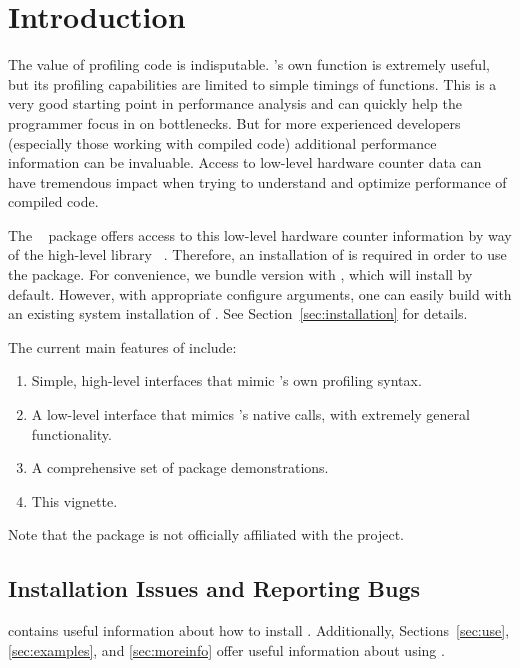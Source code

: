 \section{Introduction}
\label{sec:introduction}

The value of profiling code is indisputable.  \R's own  function 
is extremely useful, but its profiling capabilities are limited to simple 
timings of \R functions. This is a very good starting point in performance 
analysis and can quickly help the \R programmer focus in on bottlenecks.  But 
for more experienced developers (especially those working with compiled code) 
additional performance information can be invaluable. Access to low-level 
hardware counter data can have tremendous impact when trying to understand and 
optimize performance of compiled code. 

The \thispackage~\citep{Schmidt2014pbdPAPIpackage} package offers access to  
this low-level hardware counter information by way of the high-level \C library 
\PAPI~\citep{mucci1999papi}.  Therefore, an installation of \PAPI is required in 
order to use the package.  For convenience, we bundle \PAPI version \PAPIversion 
with \thispackage, which will install by default.  However, with appropriate 
configure arguments, one can easily build \thispackage with an existing system 
installation of \PAPI.  See Section~\ref{sec:installation} for details.

The current main features of \thispackage include:
\begin{enumerate}
  \item Simple, high-level interfaces that mimic \R's own profiling syntax.
  \item A low-level interface that mimics \PAPI's native calls, with extremely 
  general functionality.
  \item A comprehensive set of package demonstrations.
  \item This vignette.
\end{enumerate}

Note that the  package is not officially affiliated with the 
 project.



\subsection{Installation Issues and Reporting Bugs}

 contains useful information about how to install 
\thispackage.  Additionally, Sections~\ref{sec:use}, \ref{sec:examples}, and 
\ref{sec:moreinfo} offer useful information about using \thispackage.  

